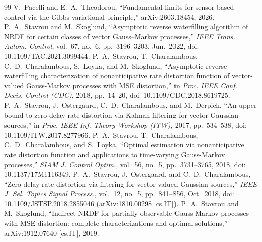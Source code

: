 \documentclass[journal]{IEEEtran}
\theoremstyle{remark}
\begin{document}
\begin{thebibliography}{99}
V.~Pacelli and E.~A.~Theodorou, ``Fundamental limits for sensor-based control via
the Gibbs variational principle,'' arXiv:2603.18454, 2026.
P.~A.~Stavrou and M.~Skoglund, ``Asymptotic reverse waterfilling algorithm of NRDF
for certain classes of vector Gauss--Markov processes,'' \emph{IEEE Trans. Autom.
Control}, vol.~67, no.~6, pp.~3196--3203, Jun.~2022, doi: 10.1109/TAC.2021.3099444.
P.~A.~Stavrou, T.~Charalambous, C.~D.~Charalambous, S.~Loyka, and M.~Skoglund,
``Asymptotic reverse-waterfilling characterization of nonanticipative rate
distortion function of vector-valued Gauss-Markov processes with MSE
distortion,'' in \emph{Proc. IEEE Conf. Decis. Control (CDC)}, 2018, pp.~14--20,
doi: 10.1109/CDC.2018.8619725.
P.~A.~Stavrou, J.~Ostergaard, C.~D.~Charalambous, and M.~Derpich, ``An upper bound
to zero-delay rate distortion via Kalman filtering for vector Gaussian sources,''
in \emph{Proc. IEEE Inf. Theory Workshop (ITW)}, 2017, pp.~534--538,
doi: 10.1109/ITW.2017.8277966.
P.~A.~Stavrou, T.~Charalambous, C.~D.~Charalambous, and S.~Loyka, ``Optimal
estimation via nonanticipative rate distortion function and applications to
time-varying Gauss-Markov processes,'' \emph{SIAM J. Control Optim.}, vol.~56,
no.~5, pp.~3731--3765, 2018, doi: 10.1137/17M1116349.
P.~A.~Stavrou, J.~Ostergaard, and C.~D.~Charalambous, ``Zero-delay rate
distortion via filtering for vector-valued Gaussian sources,'' \emph{IEEE J.
Sel. Topics Signal Process.}, vol.~12, no.~5, pp.~841--856, Oct.~2018,
doi: 10.1109/JSTSP.2018.2855046 (arXiv:1810.00298 [cs.IT]).
P.~A.~Stavrou and M.~Skoglund, ``Indirect NRDF for partially observable
Gauss-Markov processes with MSE distortion: complete characterizations and
optimal solutions,'' arXiv:1912.07640 [cs.IT], 2019.
\end{thebibliography}
\end{document}
